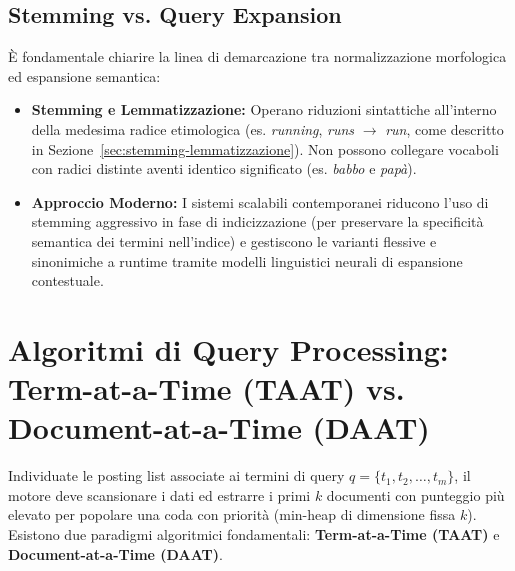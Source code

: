 \subsection{Stemming vs. Query Expansion}
\`E fondamentale chiarire la linea di demarcazione tra normalizzazione morfologica ed espansione semantica:
\begin{itemize}
    \item \textbf{Stemming e Lemmatizzazione:} Operano riduzioni sintattiche all'interno della medesima radice etimologica (es. \textit{running}, \textit{runs} $\to$ \textit{run}, come descritto in Sezione~\ref{sec:stemming-lemmatizzazione}). Non possono collegare vocaboli con radici distinte aventi identico significato (es. \textit{babbo} e \textit{pap\`a}).
    \item \textbf{Approccio Moderno:} I sistemi scalabili contemporanei riducono l'uso di stemming aggressivo in fase di indicizzazione (per preservare la specificit\`a semantica dei termini nell'indice) e gestiscono le varianti flessive e sinonimiche a runtime tramite modelli linguistici neurali di espansione contestuale.
\end{itemize}

\FloatBarrier
\section{Algoritmi di Query Processing: Term-at-a-Time (TAAT) vs. Document-at-a-Time (DAAT)}
\label{sec:taat-vs-daat}

Individuate le posting list associate ai termini di query $q = \{t_1, t_2, \dots, t_m\}$, il motore deve scansionare i dati ed estrarre i primi $k$ documenti con punteggio pi\`u elevato per popolare una coda con priorit\`a (min-heap di dimensione fissa $k$). Esistono due paradigmi algoritmici fondamentali: \textbf{Term-at-a-Time (TAAT)} e \textbf{Document-at-a-Time (DAAT)}.

